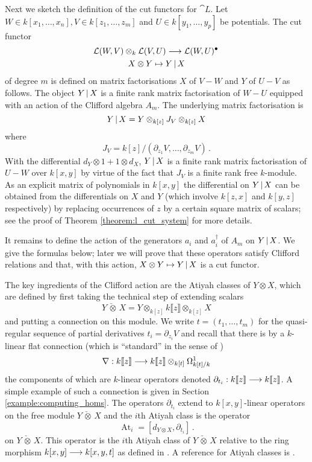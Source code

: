 \documentclass[english,letter paper,12pt,leqno]{article}
\theoremstyle{example}
\numberwithin{equation}{section}
\DeclareMathOperator{\At}{At}
\begin{document}
Next we sketch the definition of the cut functors for $\cat{L}$. Let $W \in k[x_1,\ldots,x_n], V \in k[z_1,\ldots,z_m]$ and $U \in k[y_1,\ldots,y_p]$ be potentials. The cut functor
\begin{gather*}
\mathcal{L}(W, V) \otimes_k \mathcal{L}(V, U) \longrightarrow \mathcal{L}(W, U)^\bullet\,\\
X \otimes Y \mapsto Y \,|\, X
\end{gather*}
of degree $m$ is defined on matrix factorisations $X$ of $V - W$ and $Y$ of $U - V$ as follows. The object $Y \,|\, X$ is a finite rank matrix factorisation of $W - U$ equipped with an action of the Clifford algebra $A_m$. The underlying matrix factorisation is
\[
Y \,|\, X = Y \otimes_{k[z]} J_V \otimes_{k[z]} X
\]
where
\[
J_V = k[z] / ( \partial_{z_1} V, \ldots, \partial_{z_m} V )\,.
\]
With the differential $d_Y \otimes 1 + 1 \otimes d_X$, $Y \,|\, X$ is a finite rank matrix factorisation of $U - W$ over $k[x,y]$ by virtue of the fact that $J_V$ is a finite rank free $k$-module. As an explicit matrix of polynomials in $k[x,y]$ the differential on $Y \,|\, X$ can be obtained from the differentials on $X$ and $Y$ (which involve $k[z,x]$ and $k[y,z]$ respectively) by replacing occurrences of $z$ by a certain square matrix of scalars; see the proof of Theorem \ref{theorem:l_cut_system} for more details.

It remains to define the action of the generators $a_i$ and $a_i^\dagger$ of $A_m$ on $Y \,|\, X$. We give the formulas below; later we will prove that these operators satisfy Clifford relations and that, with this action, $X \otimes Y \mapsto Y \,|\, X$ is a cut functor.

The key ingredients of the Clifford action are the Atiyah classes of $Y \otimes X$, which are defined by first taking the technical step of extending scalars
\begin{equation}\label{eq:completed_tensor_product}
Y \,\check{\otimes}\, X = Y \otimes_{k[z]} k\llbracket z \rrbracket \otimes_{k[z]} X
\end{equation}
and putting a connection on this module. We write $t = (t_1,\ldots,t_m)$ for the quasi-regular sequence of partial derivatives $t_i = \partial_{z_i} V$ and recall that there is by \cite[Appendix B]{dm1102.2957} a $k$-linear flat connection (which is ``standard'' in the sense of \cite[Definition 8.6]{dm1102.2957})
\begin{equation}\label{eq:connection_nabla}
\nabla: k\llbracket z \rrbracket \longrightarrow k\llbracket z \rrbracket \otimes_{k[t]} \Omega^1_{k[t]/k}
\end{equation}
the components of which are $k$-linear operators denoted $\partial_{t_i}: k\llbracket z \rrbracket \longrightarrow k\llbracket z \rrbracket$. A simple example of such a connection is given in Section \ref{example:computing_homs}. The operators $\partial_{t_i}$ extend to $k[x,y]$-linear operators on the free module $Y \, \check{\otimes}\, X$ and the $i$th Atiyah class is the operator
\[
\At_i = [d_{Y \otimes X}, \partial_{t_i}]\,.
\]
on $Y \,\check{\otimes}\, X$. This operator is the $i$th Atiyah class of $Y \,\check{\otimes}\, X$ relative to the ring morphism $k[x,y] \longrightarrow k[x,y,t]$ as defined in \cite[Section 9]{dm1102.2957}. A reference for Atiyah classes is \cite{buchweitz_flenner}.
\end{document}
